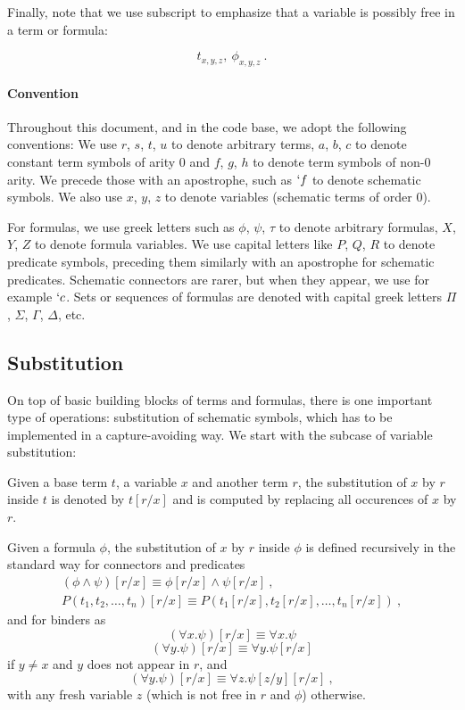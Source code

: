 Finally, note that we use subscript to emphasize that a variable is possibly free in a term or formula:

$$
  t_{x,y,z}, ~\phi_{x,y,z}~.
$$

\paragraph{Convention} Throughout this document, and in the code base, we adopt the following conventions: We use $r$, $s$, $t$, $u$ to denote arbitrary terms, $a$, $b$, $c$ to denote constant term symbols of arity $0$ and $f$, $g$, $h$ to denote term symbols of non-0 arity. We precede those with an apostrophe, such as $`f$ to denote schematic symbols. We also use $x$, $y$, $z$ to denote variables (schematic terms of order $0$).

For formulas, we use greek letters such as $\phi$, $\psi$, $\tau$ to denote arbitrary formulas, $X$, $Y$, $Z$ to denote formula variables. We use capital letters like $P$, $Q$, $R$ to denote predicate symbols, preceding them similarly with an apostrophe for schematic predicates. Schematic connectors are rarer, but when they appear, we use for example $`c$. Sets or sequences of formulas are denoted with capital greek letters $\Pi$, $\Sigma$, $\Gamma$, $\Delta$, etc.

\subsection{Substitution}
\label{subsec:substitution}
On top of basic building blocks of terms and formulas, there is one important type of operations: substitution of schematic symbols, which has to be implemented in a capture-avoiding way. We start with the subcase of variable substitution:
\begin{defin}
  Given a base term $t$, a variable $x$ and another term $r$, the substitution of $x$ by $r$ inside $t$ is denoted by $ t[r/x] $ and is computed by replacing all occurences of $x$ by $r$.

  Given a formula $\phi$, the substitution of $x$ by $r$ inside $\phi$ is defined recursively in the standard way for connectors and predicates
  \begin{gather*}
    (\phi \land \psi)[r/x] \equiv \phi[r/x] \land \psi[r/x]~,\\
    P(t_1, t_2, \ldots, t_n)[r/x] \equiv P(t_1[r/x], t_2[r/x], \ldots, t_n[r/x])~,
  \end{gather*}
  and for binders as
  $$
    (\forall x. \psi)[r/x] \equiv \forall x. \psi
  $$
  $$
    (\forall y. \psi)[r/x] \equiv \forall y. \psi[r/x]
  $$
  if $y \neq x$ and $y$ does not appear in $r$, and
  $$
    (\forall y. \psi)[r/x] \equiv \forall z. \psi[z/y][r/x]~,
  $$
  with any fresh variable $z$ (which is not free in $r$ and $\phi$) otherwise.
\end{defin}


